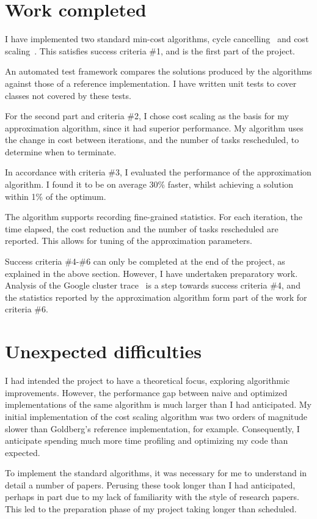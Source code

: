 \section{Work completed}

I have implemented two standard min-cost algorithms, cycle cancelling~\cite{Klein:1967} and cost scaling~\cite{Goldberg:1987}. This satisfies success criteria \#1, and is the first part of the project.

An automated test framework compares the solutions produced by the algorithms against those of a reference implementation. I have written unit tests to cover classes not covered by these tests.

For the second part and criteria \#2, I chose cost scaling as the basis for my approximation algorithm, since it had superior performance. My algorithm uses the change in cost between iterations, and the number of tasks rescheduled, to determine when to terminate.

In accordance with criteria \#3, I evaluated the performance of the approximation algorithm. I found it to be on average 30\% faster, whilst achieving a solution within 1\% of the optimum. 

The algorithm supports recording fine-grained statistics. For each iteration, the time elapsed, the cost reduction and the number of tasks rescheduled are reported. This allows for tuning of the approximation parameters.

Success criteria \#4-\#6 can only be completed at the end of the project, as explained in the above section. However, I have undertaken preparatory work. Analysis of the Google cluster trace~\cite{clusterdata:Wilkes2011} is a step towards success criteria \#4, and the statistics reported by the approximation algorithm form part of the work for criteria \#6.

\section{Unexpected difficulties}

I had intended the project to have a theoretical focus, exploring algorithmic improvements. However, the performance gap between naive and optimized implementations of the same algorithm is much larger than I had anticipated. My initial implementation of the cost scaling algorithm was two orders of magnitude slower than Goldberg's reference implementation, for example. Consequently, I anticipate spending much more time profiling and optimizing my code than expected.

To implement the standard algorithms, it was necessary for me to understand in detail a number of papers. Perusing these took longer than I had anticipated, perhaps in part due to my lack of familiarity with the style of research papers. This led to the preparation phase of my project taking longer than scheduled.

